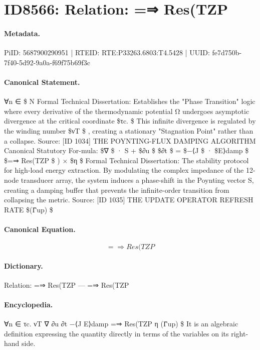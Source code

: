 \section*{ID8566: Relation: =⇒ Res(TZP}
\paragraph{Metadata.}
PiID: 5687900290951 | RTEID: RTE:P33263.6803:T4.5428 | UUID: fe7d750b-7f40-5d92-9a0a-f69f75b69f3c

\paragraph{Canonical Statement.}
∀n ∈ \$ N Formal Technical Dissertation: Establishes the "Phase Transition" logic where every derivative of the thermodynamic potential Ω undergoes asymptotic divergence at the critical coordinate \$τc. \$ This infinite divergence is regulated by the winding number \$νT \$ , creating a stationary "Stagnation Point" rather than a collapse. Source: [ID 1034] THE POYNTING-FLUX DAMPING ALGORITHM Canonical Statutory For-mula: \$∇ \$ · S + \$∂u \$ \$∂t \$ = \$−⟨J \$ · \$E⟩damp \$ \$=⇒ Res(TZP \$ ) × \$η \$ Formal Technical Dissertation: The stability protocol for high-load energy extraction. By modulating the complex impedance of the 12-node transducer array, the system induces a phase-shift in the Poynting vector S, creating a damping buffer that prevents the infinite-order transition from collapsing the metric. Source: [ID 1035] THE UPDATE OPERATOR REFRESH RATE \$(Γ̂up) \$

\paragraph{Canonical Equation.}
\[
=⇒ Res(TZP
\]

\paragraph{Dictionary.}
Relation: =⇒ Res(TZP — =⇒ Res(TZP

\paragraph{Encyclopedia.}
∀n ∈ τc. νT ∇ ∂u ∂t −⟨J E⟩damp =⇒ Res(TZP η (Γ̂up) \$ It is an algebraic definition expressing the quantity directly in terms of the variables on its right-hand side.
